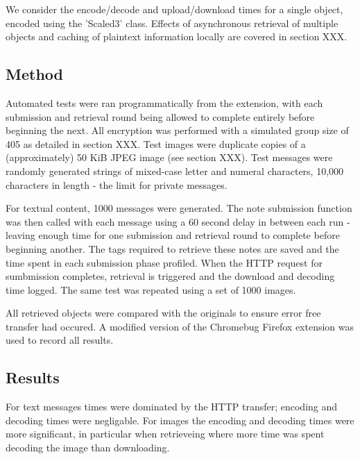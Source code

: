We consider the encode/decode and upload/download times for a single object, encoded using the 'Scaled3' class. Effects of asynchronous retrieval of multiple objects and caching of plaintext information locally are covered in section XXX.  


\subsection{Method}

Automated tests were ran programmatically from the extension, with each submission and retrieval round being allowed to complete entirely before beginning the next. All encryption was performed with a simulated group size of 405 as detailed in section XXX. Test images were duplicate copies of a (approximately) 50 KiB JPEG image (see section XXX). Test messages were randomly generated strings of mixed-case letter and numeral characters, 10,000 characters in length - the limit for private messages.

For textual content, 1000 messages were generated. The note submission function was then called with each message using a 60 second delay in between each run - leaving enough time for one submission and retrieval round to complete before beginning another. The tags required to retrieve these notes are saved and the time spent in each submission phase profiled. When the HTTP request for sumbmission completes, retrieval is triggered and the download and decoding time logged. The same test was repeated using a set of 1000 images.

All retrieved objects were compared with the originals to ensure error free transfer had occured. A modified version of the Chromebug Firefox extension was used to record all results.


\subsection{Results}

For text messages times were dominated by the HTTP transfer; encoding and decoding times were negligable. For images the encoding and decoding times were more significant, in particular when retrieveing where more time was spent decoding the image than downloading.

